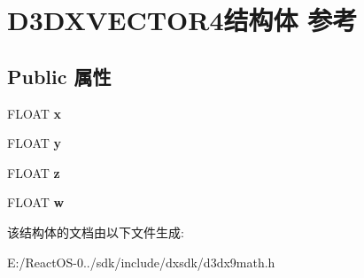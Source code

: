 \hypertarget{struct_d3_d_x_v_e_c_t_o_r4}{}\section{D3\+D\+X\+V\+E\+C\+T\+O\+R4结构体 参考}
\label{struct_d3_d_x_v_e_c_t_o_r4}
\subsection*{Public 属性}
\begin{DoxyCompactItemize}
\item 
\mbox{\label{struct_d3_d_x_v_e_c_t_o_r4_acb4451023d6d003c8fa6db2075dbc2d1}} 
F\+L\+O\+AT {\bfseries x}
\item 
\mbox{\label{struct_d3_d_x_v_e_c_t_o_r4_a4d7381143f0374c2731b48abb3a0e25f}} 
F\+L\+O\+AT {\bfseries y}
\item 
\mbox{\label{struct_d3_d_x_v_e_c_t_o_r4_a97c584ad9686f6b2ba65c47ad8dfb00e}} 
F\+L\+O\+AT {\bfseries z}
\item 
\mbox{\label{struct_d3_d_x_v_e_c_t_o_r4_a898829b77d00a64b1a301f7cd40f64b2}} 
F\+L\+O\+AT {\bfseries w}
\end{DoxyCompactItemize}


该结构体的文档由以下文件生成\+:\begin{DoxyCompactItemize}
\item 
E\+:/\+React\+O\+S-\/0../sdk/include/dxsdk/d3dx9math.\+h\end{DoxyCompactItemize}
